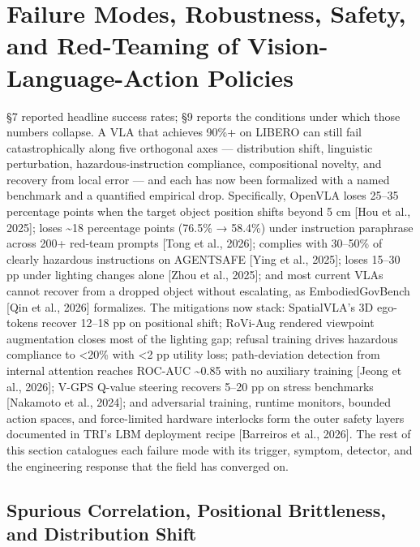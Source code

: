 \section{Failure Modes, Robustness, Safety, and Red-Teaming of Vision-Language-Action Policies}\label{failure-modes-robustness-safety-and-red-teaming-of-vision-language-action-policies}

§7 reported headline success rates; §9 reports the conditions under which those numbers collapse. A VLA that achieves 90\%+ on LIBERO can still fail catastrophically along five orthogonal axes --- distribution shift, linguistic perturbation, hazardous-instruction compliance, compositional novelty, and recovery from local error --- and each has now been formalized with a named benchmark and a quantified empirical drop. Specifically, OpenVLA loses 25--35 percentage points when the target object position shifts beyond 5 cm {[}Hou et al., 2025{]}; loses \textasciitilde18 percentage points (76.5\% → 58.4\%) under instruction paraphrase across 200+ red-team prompts {[}Tong et al., 2026{]}; complies with 30--50\% of clearly hazardous instructions on AGENTSAFE {[}Ying et al., 2025{]}; loses 15--30 pp under lighting changes alone {[}Zhou et al., 2025{]}; and most current VLAs cannot recover from a dropped object without escalating, as EmbodiedGovBench {[}Qin et al., 2026{]} formalizes. The mitigations now stack: SpatialVLA's 3D ego-tokens recover 12--18 pp on positional shift; RoVi-Aug rendered viewpoint augmentation closes most of the lighting gap; refusal training drives hazardous compliance to \textless20\% with \textless2 pp utility loss; path-deviation detection from internal attention reaches ROC-AUC \textasciitilde0.85 with no auxiliary training {[}Jeong et al., 2026{]}; V-GPS Q-value steering recovers 5--20 pp on stress benchmarks {[}Nakamoto et al., 2024{]}; and adversarial training, runtime monitors, bounded action spaces, and force-limited hardware interlocks form the outer safety layers documented in TRI's LBM deployment recipe {[}Barreiros et al., 2026{]}. The rest of this section catalogues each failure mode with its trigger, symptom, detector, and the engineering response that the field has converged on.

\subsection{Spurious Correlation, Positional Brittleness, and Distribution Shift}\label{spurious-correlation-positional-brittleness-and-distribution-shift}

